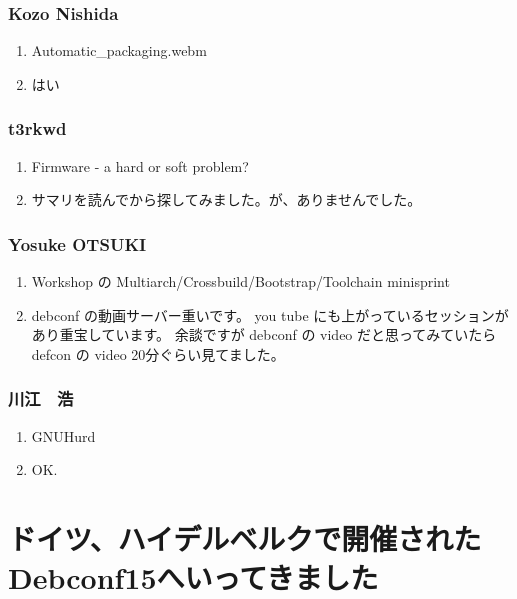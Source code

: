 \documentclass[cjk,dvipdfmx,10pt,compress,%
hyperref={bookmarks=true,bookmarksnumbered=true,bookmarksopen=false,%
colorlinks=false,%
pdftitle={第 102 回 関西 Debian 勉強会},%
pdfauthor={倉敷・のがた・佐々木・かわだ},%
pdfsubject={資料},%
}]{beamer}
\begin{document}
\begin{frame}
  \frametitle{ Kozo Nishida }
  \begin{enumerate}
  \item Automatic\_packaging.webm
  \item はい
  \end{enumerate}
\end{frame}

\begin{frame}
  \frametitle{ t3rkwd }
  \begin{enumerate}
  \item Firmware - a hard or soft problem?
  \item サマリを読んでから探してみました。が、ありませんでした。
  \end{enumerate}
\end{frame}

\begin{frame}
  \frametitle{ Yosuke OTSUKI }
  \begin{enumerate}
  \item Workshop の Multiarch/Crossbuild/Bootstrap/Toolchain minisprint
  \item debconf の動画サーバー重いです。 you tube にも上がっているセッションがあり重宝しています。 余談ですが debconf の video だと思ってみていたら defcon の video 20分ぐらい見てました。
  \end{enumerate}
\end{frame}

\begin{frame}
  \frametitle{ 川江　浩 }
  \begin{enumerate}
  \item GNUHurd
  \item OK.
  \end{enumerate}
\end{frame}


\section{ドイツ、ハイデルベルクで開催されたDebconf15へいってきました}

\end{document}
